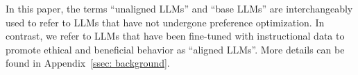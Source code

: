 
In this paper, the terms “unaligned LLMs” and “base LLMs” are interchangeably used to refer to LLMs that have not undergone preference optimization. 
In contrast, we refer to LLMs that have been fine-tuned with instructional data to promote ethical and beneficial behavior as “aligned LLMs”.
%
More details can be found in Appendix~\ref{ssec: background}.





